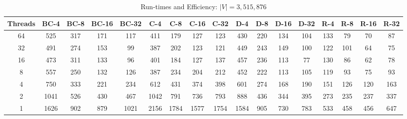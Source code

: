 \begin{table}[t]
\begin{minipage}[b]{\textwidth}
\label{tab:graph4}
\caption{Run-times and Efficiency: $\left \vert V \right \vert = 3,515,876$}
{\small
\begin{tabular}{||c||c|c|c|c||c|c|c|c||c|c|c|c||c|c|c|c|}
\hline
\textbf{Threads}	&\cellcolor{black!10}BC-4&	\cellcolor{black!10}BC-8	&\cellcolor{black!10}BC-16	&\cellcolor{black!10}BC-32&	\cellcolor{black!10}C-4	&\cellcolor{black!10}C-8&	\cellcolor{black!10}C-16&	\cellcolor{black!10}C-32&	\cellcolor{black!10}D-4&	\cellcolor{black!10}D-8	&\cellcolor{black!10}D-16&\cellcolor{black!10}	D-32&	\cellcolor{black!10}R-4	&\cellcolor{black!10}R-8&	\cellcolor{black!10}R-16&	\cellcolor{black!10}R-32 \\ \hline \hline
64 &		525&	317	&171&	117	&411	&179&	127	&123	&430	&220	&134	&104&	133&	79&	70	&87	 \\ \hline		
32	&	491&	274	&153	&99	&387	&202	&123	&121 &449	&243&	149&	100	&122	&101&	64&	75\\ \hline
16	&	473	&311	&133	&96	&401	&184	&127	&137 &457	&236	&113	&77	&130	&86	&62	&78 \\ \hline
8	&	557&	250	&132	&126	&387	&234	&204	&212 &452	&222	&113	&105	&119&	93	&75	&93 \\ \hline
4		&750&	333	&221	&234	&612	&431	&374	&398 &601	&274 &168	&190	&151	&126&	120	&163 \\ \hline
2		&1041 &526 &430 &467	&1042	&791	&736	&793 &888	&436	&344	&395	&273	&235	&237	&337 \\ \hline
1		&1626&902&879 &1021 &2156 &1784 &1577 &1754 &1584 &905 &730 &783& 533 &458 &456 &647 \\ \hline
\end{tabular}
}
\end{minipage}
\end{table}
